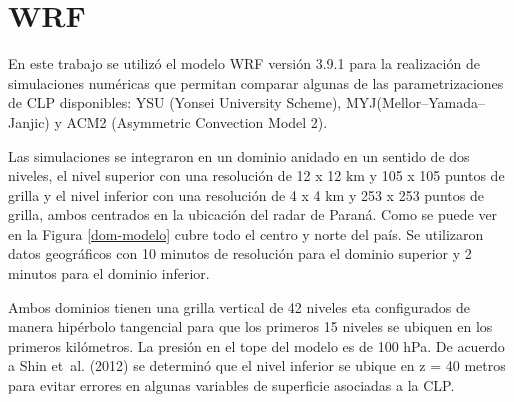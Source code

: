 \documentclass[12pt,spanish,oneside]{book}
\begin{document}
\section{WRF}\label{wrf}

En este trabajo se utilizó el modelo WRF versión 3.9.1 para la
realización de simulaciones numéricas que permitan comparar algunas de
las parametrizaciones de CLP disponibles: YSU (Yonsei University
Scheme), MYJ(Mellor--Yamada--Janjic) y ACM2 (Asymmetric Convection Model
2).

Las simulaciones se integraron en un dominio anidado en un sentido de
dos niveles, el nivel superior con una resolución de 12 x 12 km y 105 x
105 puntos de grilla y el nivel inferior con una resolución de 4 x 4 km
y 253 x 253 puntos de grilla, ambos centrados en la ubicación del radar
de Paraná. Como se puede ver en la Figura \ref{dom-modelo} cubre todo el
centro y norte del país. Se utilizaron datos geográficos con 10 minutos
de resolución para el dominio superior y 2 minutos para el dominio
inferior.

Ambos dominios tienen una grilla vertical de 42 niveles eta configurados
de manera hipérbolo tangencial para que los primeros 15 niveles se
ubiquen en los primeros kilómetros. La presión en el tope del modelo es
de 100 hPa. De acuerdo a Shin et~al. (2012) se determinó que el nivel
inferior se ubique en z = 40 metros para evitar errores en algunas
variables de superficie asociadas a la CLP.
\end{document}
